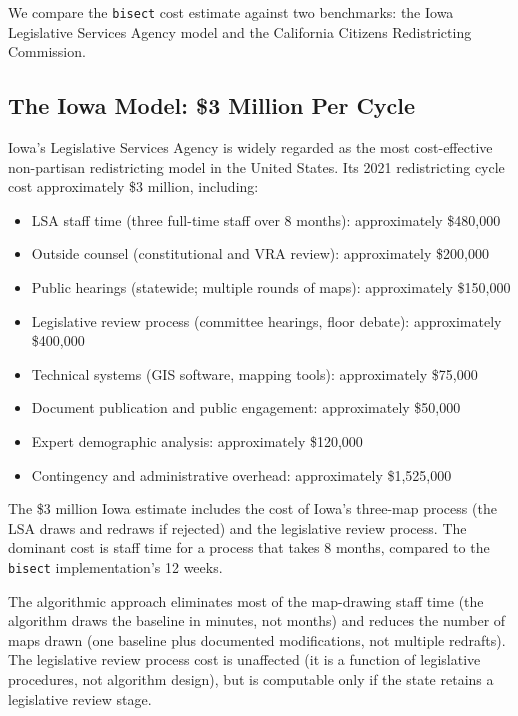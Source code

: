 We compare the \texttt{bisect} cost estimate against two benchmarks: the Iowa Legislative Services Agency model and the California Citizens Redistricting Commission.

\subsection{The Iowa Model: \$3 Million Per Cycle}

Iowa's Legislative Services Agency is widely regarded as the most cost-effective non-partisan redistricting model in the United States. Its 2021 redistricting cycle cost approximately \$3 million, including:

\begin{itemize}
  \item LSA staff time (three full-time staff over 8 months): approximately \$480,000
  \item Outside counsel (constitutional and VRA review): approximately \$200,000
  \item Public hearings (statewide; multiple rounds of maps): approximately \$150,000
  \item Legislative review process (committee hearings, floor debate): approximately \$400,000
  \item Technical systems (GIS software, mapping tools): approximately \$75,000
  \item Document publication and public engagement: approximately \$50,000
  \item Expert demographic analysis: approximately \$120,000
  \item Contingency and administrative overhead: approximately \$1,525,000
\end{itemize}

The \$3 million Iowa estimate includes the cost of Iowa's three-map process (the LSA draws and redraws if rejected) and the legislative review process. The dominant cost is staff time for a process that takes 8 months, compared to the \texttt{bisect} implementation's 12 weeks.

The algorithmic approach eliminates most of the map-drawing staff time (the algorithm draws the baseline in minutes, not months) and reduces the number of maps drawn (one baseline plus documented modifications, not multiple redrafts). The legislative review process cost is unaffected (it is a function of legislative procedures, not algorithm design), but is computable only if the state retains a legislative review stage.

